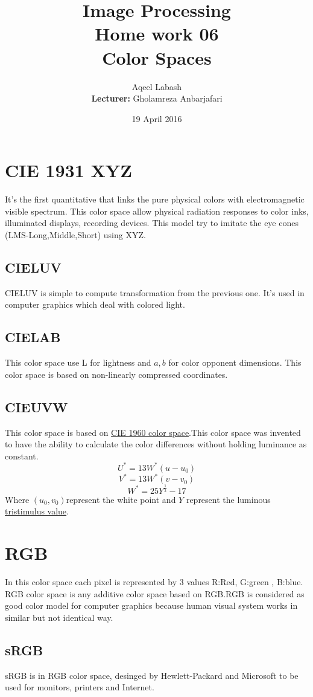 \documentclass{article}
\title{Image Processing\\
	Home work 06\\Color Spaces  }
\author{Aqeel Labash\\ \textbf{Lecturer:} Gholamreza Anbarjafari}
\date{19 April 2016}
\begin{document}
	\maketitle
	\begin{multicols*}{2}
	\section*{CIE 1931 XYZ}
	It's the first quantitative that links the pure physical colors with electromagnetic visible spectrum.\cite{2} This color space allow physical radiation responses to color inks, illuminated displays, recording devices.\cite{2} This model try to imitate the eye cones (LMS-Long,Middle,Short) using XYZ.\cite{2}
	\subsection*{CIELUV}
	CIELUV is simple to compute transformation from the previous one. It's used in computer graphics which deal with colored light.
	\subsection*{CIELAB}
	This color space use L for lightness and \(a,b\) for color opponent dimensions. This color space is based on non-linearly compressed coordinates. \cite{3}
	\subsection*{CIEUVW}
	This color space is based on \href{https://en.wikipedia.org/wiki/CIE_1960_color_space}{CIE 1960 color space}.This color space was invented to have the ability to calculate the color differences without holding luminance as constant.
	\[ U^*=13W^*(u-u_0)\]
	\[ V^*=13W^*(v-v_0)\]
	\[ W^*=25Y^{\frac{1}{3}}-17\]
	Where \((u_0,v_0)\)represent the white point and \(Y\) represent the luminous \href{https://en.wikipedia.org/wiki/CIE_1931_color_space#Tristimulus_values}{tristimulus value}.\cite{4}
	\section*{RGB}
	In this color space each pixel is represented by 3 values R:Red, G:green , B:blue. RGB color space is any additive color space based on RGB.RGB is considered as good color model for computer graphics because human visual system works in similar but not identical way.\cite{5}
	\subsection*{sRGB}
	sRGB is in RGB color space, desinged by Hewlett-Packard and Microsoft to be used for monitors, printers and Internet.\cite{6}

\end{multicols*}
\end{document}

